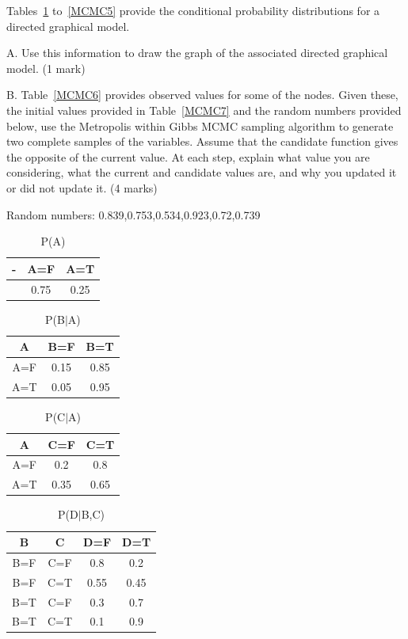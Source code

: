 \documentclass{article}
\begin{document}
Tables~\ref{MCMC1} to~\ref{MCMC5} provide the conditional probability distributions for a directed graphical model.

A. Use this information to draw the graph of the associated directed graphical model. (1 mark)

B. Table~\ref{MCMC6} provides observed values for some of the nodes. Given these, the initial values provided in Table~\ref{MCMC7} and the random numbers provided below, use the Metropolis within Gibbs MCMC sampling algorithm to generate two complete samples of the variables. Assume that the candidate function gives the opposite of the current value. At each step, explain what value you are considering, what the current and candidate values are, and why you updated it or did not update it. (4 marks)

Random numbers: 0.839,0.753,0.534,0.923,0.72,0.739 
\begin{table}[h!]
\caption{P(A)}
\label{MCMC1}
\begin{center}
\begin{tabular}{ |c||c|c| } 
\hline
 - & A=F & A=T\\
\hline
 & 0.75 & 0.25\\
\hline
\end{tabular}
\end{center}
\end{table}
\begin{table}[h!]
\caption{P(B$|$A)}
\label{MCMC2}
\begin{center}
\begin{tabular}{ |c||c|c| } 
\hline
 A & B=F & B=T\\
\hline
 A=F & 0.15 & 0.85\\
 A=T & 0.05 & 0.95\\
\hline
\end{tabular}
\end{center}
\end{table}
\begin{table}[h!]
\caption{P(C$|$A)}
\label{MCMC3}
\begin{center}
\begin{tabular}{ |c||c|c| } 
\hline
 A & C=F & C=T\\
\hline
 A=F & 0.2 & 0.8\\
 A=T & 0.35 & 0.65\\
\hline
\end{tabular}
\end{center}
\end{table}
\begin{table}[h!]
\caption{P(D$|$B,C)}
\label{MCMC4}
\begin{center}
\begin{tabular}{ |c|c||c|c| } 
\hline
 B & C & D=F & D=T\\
\hline
 B=F & C=F & 0.8 & 0.2\\
 B=F & C=T & 0.55 & 0.45\\
 B=T & C=F & 0.3 & 0.7\\
 B=T & C=T & 0.1 & 0.9\\
\hline
\end{tabular}
\end{center}
\end{table}
\end{document}

